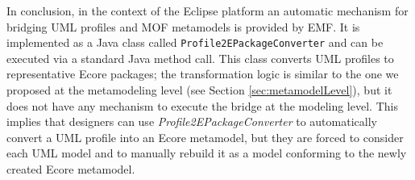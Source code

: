 In conclusion, in the context of the Eclipse platform an automatic mechanism for bridging UML profiles and MOF metamodels is provided by EMF.
It is implemented as a Java class called \texttt{Profile2EPackageConverter} and  can be executed via a standard Java method call. 
This class converts UML profiles to representative Ecore packages; the transformation logic is similar to the one we proposed at the metamodeling
level (see Section \ref{sec:metamodelLevel}), but it does not have any mechanism to execute the bridge at the modeling level. This implies that
designers can use \textit{Profile2EPackageConverter} to automatically convert a UML profile into an Ecore metamodel, but they are forced to consider each UML model and to manually rebuild it as a model conforming to the newly created Ecore metamodel.